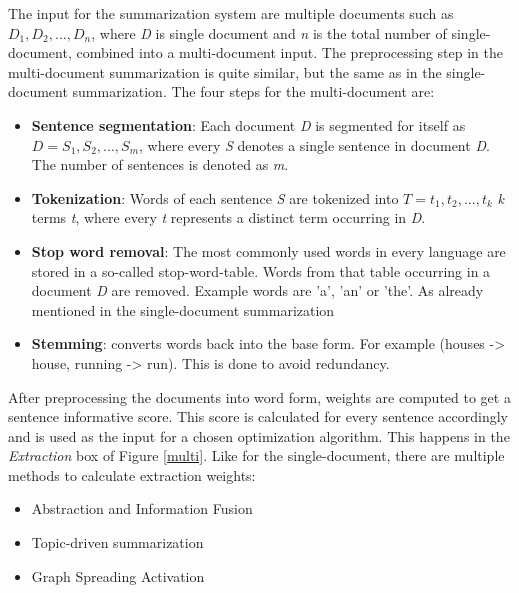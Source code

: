 The input for the summarization system are multiple documents such as \(D_{1}, D_{2},..., D_{n}\), where \textit{D} is single document and \textit{n} is the total number of single-document, combined into a multi-document input.
The preprocessing step in the multi-document summarization is quite similar, but the same as in the single-document summarization. The four steps for the multi-document are:
 
\begin{itemize}
	\item \textbf{Sentence segmentation}: Each document \textit{D} is segmented for itself as \(D = {S_{1}, S_{2},..., S_{m}}\), where every \textit{S} denotes a single sentence in document \textit{D}. The number of sentences is denoted as \textit{m}.
	\item \textbf{Tokenization}: Words of each sentence \textit{S} are tokenized into \(T = {t_{1}, t_{2},..., t_{k}}\) \textit{k} terms \textit{t}, where every \textit{t} represents a distinct term occurring in \textit{D}. 
	\item \textbf{Stop word removal}: The most commonly used words in every language are stored in a so-called stop-word-table. Words from that table occurring in a document \textit{D} are removed. Example words are 'a', 'an' or 'the'. As already mentioned in the single-document summarization
	\item \textbf{Stemming}: converts words back into the base form. For example (houses -> house, running -> run). This is done to avoid redundancy.
\end{itemize}
 
 
After preprocessing the documents into word form, weights are computed to get a sentence informative score. This score is calculated for every sentence accordingly and is used as the input for a chosen optimization algorithm. This happens in the \textit{Extraction} box of Figure \ref{multi}. Like for the single-document, there are multiple methods to calculate extraction weights:

\begin{itemize}
	\item Abstraction and Information Fusion
	\item Topic-driven summarization
	\item Graph Spreading Activation
\end{itemize}


